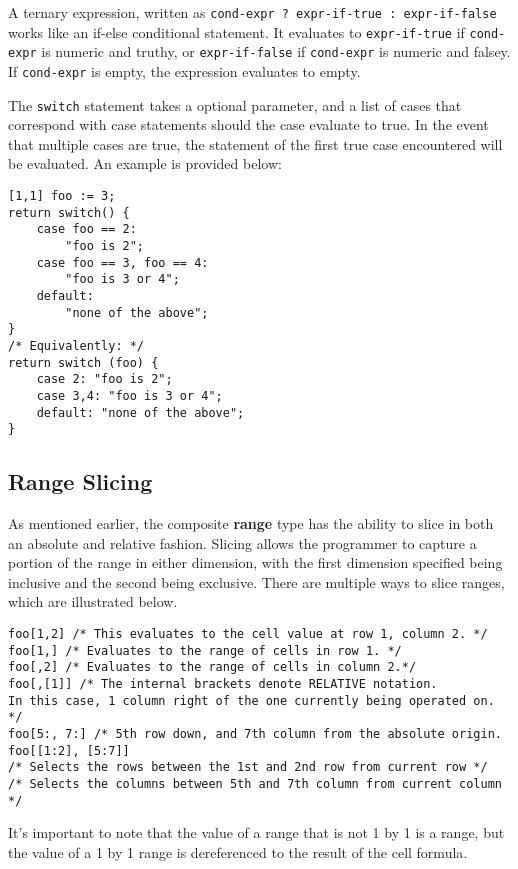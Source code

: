 			A ternary expression, written as \texttt{cond-expr ? expr-if-true : expr-if-false} works like an if-else conditional statement. It evaluates to \texttt{expr-if-true} if \texttt{cond-expr} is numeric and truthy, or  \texttt{expr-if-false} if \texttt{cond-expr} is numeric and falsey. If \texttt{cond-expr} is empty, the expression evaluates to empty.
			
			The \texttt{switch} statement takes a optional parameter, and a list of cases that correspond with case statements should the case evaluate to true. In the event that multiple cases are true, the statement of the first true case encountered will be evaluated. An example is provided below:
			\begin{lstlisting}
[1,1] foo := 3;
return switch() {
	case foo == 2:
		"foo is 2";
	case foo == 3, foo == 4:
		"foo is 3 or 4";
	default:
		"none of the above";
}
/* Equivalently: */
return switch (foo) {
	case 2: "foo is 2";
	case 3,4: "foo is 3 or 4";
	default: "none of the above";
}
			\end{lstlisting}
		\subsection{Range Slicing}
			As mentioned earlier, the composite \textbf{range} type has the ability to slice in both an absolute and relative fashion. Slicing allows the programmer to capture a portion of the range in either dimension, with the first dimension specified being inclusive and the second being exclusive. There are multiple ways to slice ranges, which are illustrated below.\newline
			\begin{lstlisting}
foo[1,2] /* This evaluates to the cell value at row 1, column 2. */
foo[1,] /* Evaluates to the range of cells in row 1. */
foo[,2] /* Evaluates to the range of cells in column 2.*/
foo[,[1]] /* The internal brackets denote RELATIVE notation. 
In this case, 1 column right of the one currently being operated on. */ 
foo[5:, 7:] /* 5th row down, and 7th column from the absolute origin.
foo[[1:2], [5:7]] 
/* Selects the rows between the 1st and 2nd row from current row */
/* Selects the columns between 5th and 7th column from current column */
			\end{lstlisting}
			It's important to note that the value of a range that is not 1 by 1 is a range, but the value of a 1 by 1 range is dereferenced to the result of the cell formula.
